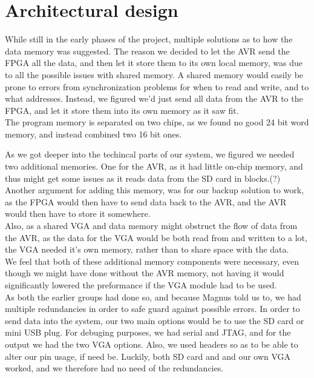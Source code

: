 \section {Architectural design}

While still in the early phases of the project, multiple solutions as to how the data memory was suggested. The reason we decided to let the AVR send the FPGA all the data, and then let it store them to its own local memory, was due to all the possible issues with shared memory. A shared memory would easily be prone to errors from synchronization problems for when to read and write, and to what addresses. Instead, we figured we'd just send all data from the AVR to the FPGA, and let it store them into its own memory as it saw fit.\\

The program memory is separated on two chips, as we found no good 24 bit word memory, and instead combined two 16 bit ones.

As we got deeper into the techincal parts of our system, we figured we needed two additional memories. One for the AVR, as it had little on-chip memory, and thus might get some issues as it reads data from the SD card in blocks.(?) Another argument for adding this memory, was for our backup solution to work, as the FPGA would then have to send data back to the AVR, and the AVR would then have to store it somewhere.\\

Also, as a shared VGA and data memory might obstruct the flow of data from the AVR, as the data for the VGA would be both read from and written to a lot, the VGA needed it's own memory, rather than to share space with the data.\\

We feel that both of these additional memory components were necessary, even though we might have done without the AVR memory, not having it would significantly lowered the preformance if the VGA module had to be used.\\

As both the earlier groups had done so, and because Magnus told us to, we had multiple redundancies in order to safe guard against possible errors. In order to send data into the system, our two main options would be to use the SD card or mini USB plug. For debuging purposes, we had serial and JTAG, and for the output we had the two VGA options. Also, we used headers so as to be able to alter our pin usage, if need be. Luckily, both SD card and and our own VGA worked, and we therefore had no need of the redundancies.
